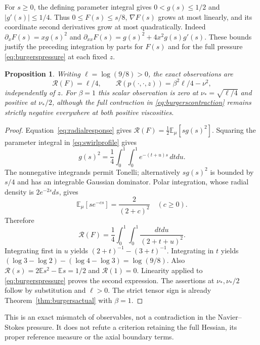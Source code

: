 \documentclass[11pt]{article}
\newtheorem{proposition}[theorem]{Proposition}
\newcommand{\E}{\mathbb E}
\begin{document}
For $s\ge0$, the defining parameter integral gives
$0<g(s)\le1/2$ and $|g'(s)|\le1/4$.
Thus $0\le F(s)\le s/8$, $\nabla F(s)$ grows at most linearly,
and its coordinate second derivatives grow at most quadratically.
Indeed $\partial_xF(s)=xg(s)^2$ and
$\partial_{xx}F(s)=g(s)^2+4x^2g(s)g'(s)$.
These bounds justify the preceding integration by parts for $F(s)$
and for the full pressure \eqref{eq:burgerspressure} at each fixed $z$.

\begin{proposition}\label{prop:burgersresponse}
Writing $\ell=\log(9/8)>0$, the exact observations are
\begin{equation}\label{eq:exactpressure}
 \mathcal R(F)=\ell/4,\qquad
 \mathcal R(p(\cdot,\cdot,z))=\beta^2\ell/4-\nu^2,
\end{equation}
independently of $z$. For $\beta=1$ this scalar observation is zero
at $\nu_* =\sqrt{\ell/4}$ and positive at $\nu_*/2$, although the
full contraction in \eqref{eq:burgerscontraction} remains strictly
negative everywhere at both positive viscosities.
\end{proposition}
\begin{proof}
Equation~\eqref{eq:radialresponse} gives
$\mathcal R(F)=\frac12\E_\mu[s g(s)^2]$.
Squaring the parameter integral in \eqref{eq:swirlprofile} gives
\[
 g(s)^2=\frac14\int_0^1\!\int_0^1 e^{-(t+u)s}\,dtdu.
\]
The nonnegative integrands permit Tonelli; alternatively $sg(s)^2$
is bounded by $s/4$ and has an integrable Gaussian dominator.
Polar integration, whose radial density is $2e^{-2s}ds$, gives
\[
 \E_\mu[s e^{-cs}]=\frac{2}{(2+c)^2}\quad(c\ge0).
\]
Therefore
\[
 \mathcal R(F)=\frac14\int_0^1\!\int_0^1
       \frac{dtdu}{(2+t+u)^2}.
\]
Integrating first in $u$ yields $(2+t)^{-1}-(3+t)^{-1}$.
Integrating in $t$ yields
$(\log3-\log2)-(\log4-\log3)=\log(9/8)$.
Also $\mathcal R(s)=2\E s^2-\E s=1/2$ and
$\mathcal R(1)=0$. Linearity applied to
\eqref{eq:burgerspressure} proves the second expression.
The assertions at $\nu_*,\nu_*/2$ follow by substitution and
$\ell>0$. The strict tensor sign is already
Theorem~\ref{thm:burgersactual} with $\beta=1$.
\end{proof}

This is an exact mismatch of observables, not a contradiction in the
Navier--Stokes pressure. It does not refute a criterion retaining the
full Hessian, its proper reference measure or the axial boundary terms.
\end{document}
